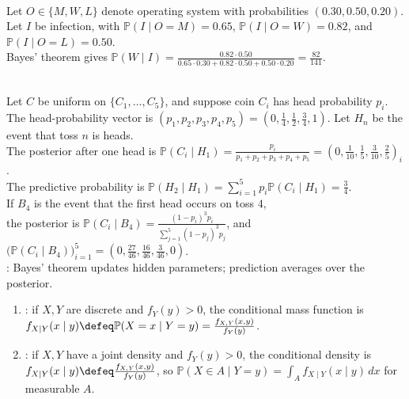 \begin{example} \label{ex:bayes-computer-virus-operating-system} \\
Let $O\in\{M,W,L\}$ denote operating system with probabilities $(0.30,0.50,0.20)$.\\
Let $I$ be infection, with $\mathbb{P}(I\mid O=M)=0.65$, $\mathbb{P}(I\mid O=W)=0.82$, and $\mathbb{P}(I\mid O=L)=0.50$.\\
Bayes' theorem gives $\mathbb{P}(W\mid I) =\frac{0.82\cdot0.50}{0.65\cdot0.30+0.82\cdot0.50+0.50\cdot0.20} =\frac{82}{141}$.
\end{example}

\begin{example} \label{ex:bayesian-coin-box-posterior-predictive} \\
Let $C$ be uniform on $\{C_1,\ldots,C_5\}$, and suppose coin $C_i$ has head probability $p_i$.\\
The head-probability vector is $(p_1,p_2,p_3,p_4,p_5)=\left(0,\frac14,\frac12,\frac34,1\right)$. Let $H_n$ be the event that toss $n$ is heads.\\
The posterior after one head is $\mathbb{P}(C_i\mid H_1) =\frac{p_i}{p_1+p_2+p_3+p_4+p_5} =\left(0,\frac{1}{10},\frac15,\frac{3}{10},\frac25\right)_i$.\\
The predictive probability is $\mathbb{P}(H_2\mid H_1)=\sum\limits_{i=1}^5p_i\mathbb{P}(C_i\mid H_1)=\frac34$.\\
If $B_4$ is the event that the first head occurs on toss $4$,\\
the posterior is $\mathbb{P}(C_i\mid B_4)=\frac{(1-p_i)^3p_i}{\sum\limits_{j=1}^5(1-p_j)^3p_j}$, and $\bigl(\mathbb{P}(C_i\mid B_4)\bigr)_{i=1}^5=\left(0,\frac{27}{46},\frac{16}{46},\frac{3}{46},0\right)$.\\
: Bayes' theorem updates hidden parameters; prediction averages over the posterior.
\end{example}

\begin{definition} \label{def:conditional-mass-and-density-functions} 
\begin{enumerate}[label=(\roman*)]
\setlength{\itemsep}{0pt}
\item {}: if $X,Y$ are discrete and $f_Y(y)>0$, the conditional mass function is\\
$f_{X\mid Y}(x\mid y)\defeq\mathbb{P}(X=x\mid Y=y)=\frac{f_{X,Y}(x,y)}{f_Y(y)}$.
\item {}: if $X,Y$ have a joint density and $f_Y(y)>0$, the conditional density is\\
$f_{X\mid Y}(x\mid y)\defeq \frac{f_{X,Y}(x,y)}{f_Y(y)}$, so $\mathbb{P}(X\in A\mid Y=y)=\int_A f_{X\mid Y}(x\mid y)\,dx$ for measurable $A$.
\end{enumerate}
\end{definition}

